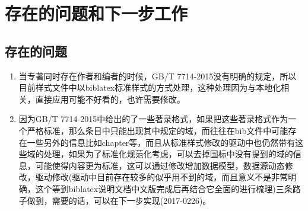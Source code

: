 \section{存在的问题和下一步工作}


\subsection{存在的问题}

\begin{enumerate}






  \item 当专著同时存在作者和编者的时候，GB/T 7714-2015没有明确的规定，所以目前样式文件中以biblatex标准样式的方式处理，这种处理因为与本地化相关，直接应用可能不好看的，也许需要修改。

  \item 因为GB/T 7714-2015中给出的了一些著录格式，如果把这些著录格式作为一个严格标准，那么条目中只能出现其中规定的域，而往往在bib文件中可能存在一些另外的信息比如chapter等，而且从标准样式修改的驱动中也仍然带有这些域的处理，如果为了标准化规范化考虑，可以去掉国标中没有提到的域的信息，可能使得内容更为标准，这可以通过修改增加数据模型，数据源动态修改，驱动修改(驱动中目前存在较多的似乎用不到的域，而且意义不是非常明确，这个等到biblatex说明文档中文版完成后再结合它全面的进行梳理)三条路子做到，需要的话，可以在下一步实现(2017-0226)。
\end{enumerate}

